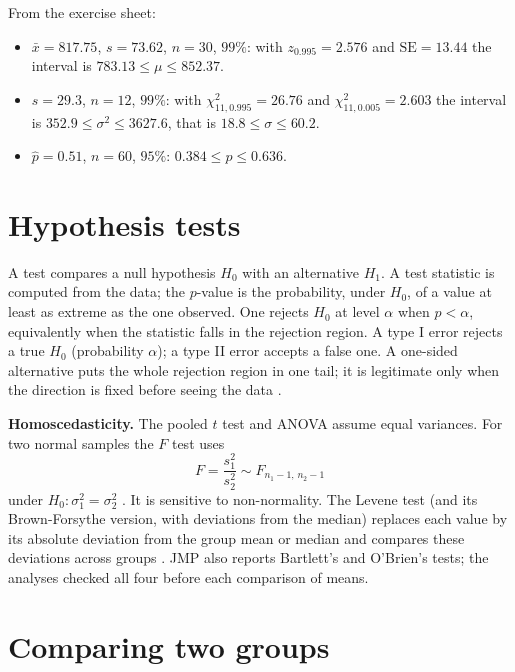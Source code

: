 \begin{example}
\label{example-confidence-intervals}
From the exercise sheet:
\begin{itemize}
\item $\bar{x} = 817.75$, $s = 73.62$,
$n = 30$, $99\%$: with
$z_{0.995} = 2.576$ and
$\mathrm{SE} = 13.44$ the interval is
$783.13 \leq \mu \leq 852.37$.
\item $s = 29.3$, $n = 12$, $99\%$: with
$\chi^2_{11,0.995} = 26.76$ and
$\chi^2_{11,0.005} = 2.603$ the interval
is $352.9 \leq \sigma^2 \leq 3627.6$,
that is $18.8 \leq \sigma \leq 60.2$.
\item $\hat{p} = 0.51$, $n = 60$, $95\%$:
$0.384 \leq p \leq 0.636$.
\end{itemize}
\end{example}

\section{Hypothesis tests}
\label{section-tests}

A test compares a null hypothesis $H_0$
with an alternative $H_1$. A test
statistic is computed from the data; the
$p$-value is the probability, under
$H_0$, of a value at least as extreme as
the one observed. One rejects $H_0$ at
level $\alpha$ when $p < \alpha$,
equivalently when the statistic falls
in the rejection region. A type I error
rejects a true $H_0$ (probability
$\alpha$); a type II error accepts a
false one. A one-sided alternative puts
the whole rejection region in one tail;
it is legitimate only when the direction
is fixed before seeing the data
\cite[Sections
7.2--7.4]{rosner2011biostatistics}.

\textbf{Homoscedasticity.}
The pooled $t$ test and ANOVA assume equal
variances. For two normal samples the $F$
test uses
$$
F = \frac{s_1^2}{s_2^2}
\sim F_{n_1-1,\,n_2-1}
$$
under $H_0\colon \sigma_1^2 = \sigma_2^2$
\cite[Section
8.6]{rosner2011biostatistics}.
It is sensitive to non-normality. The
Levene test (and its Brown-Forsythe
version, with deviations from the median)
replaces each value by its absolute
deviation from the group mean or median
and compares these deviations across
groups \cite[Section
9-5]{triola2012elementary}. JMP also
reports Bartlett's and O'Brien's tests;
the analyses checked all four
before each comparison of means.

\section{Comparing two groups}
\label{section-two-samples}

